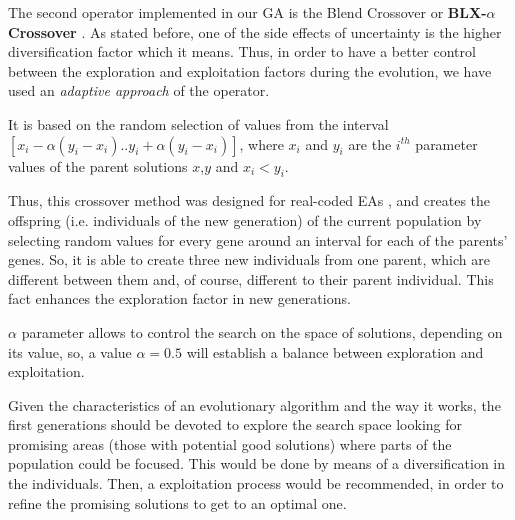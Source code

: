 \documentclass[10pt,journal,compsoc]{IEEEtran}
\begin{document}
The second operator implemented in our GA is the Blend Crossover or  \textbf{BLX-$\alpha$ Crossover} \cite{blx2008}. As stated before, one of the side effects of uncertainty is the higher diversification factor which it means. Thus, in order to have a better control between the exploration and exploitation factors during the evolution, we have used an \textit{adaptive approach} of the operator.

It is based on the random selection of values from the interval
$[x_i-\alpha(y_i-x_i).. y_i+\alpha(y_i-x_i)]$, where $x_i$ and $y_i$
are the $i^{th}$ parameter values of the parent solutions $x$,$y$ and
$x_i < y_i$. %


Thus, this crossover method was designed for real-coded EAs \cite{blx2008}, and creates the offspring (i.e. individuals of the new generation) of the current population by selecting random values for every gene around an interval for each of the parents' genes. So, it is able to create three new individuals from one parent, which are different between them and, of course, different to their parent individual. This fact enhances the exploration factor in new generations.

$\alpha$ parameter allows to control the search on the space of solutions, depending on its value, so, a value $\alpha = 0.5$ will establish a balance between exploration and exploitation.

Given the characteristics of an evolutionary algorithm and the way it works, the first generations should be devoted to explore the search space looking for promising areas (those with potential good solutions) where parts of the population could be focused. This would be done by means of a diversification in the individuals. Then, a exploitation process would be recommended, in order to refine the promising solutions to get to an optimal one.
\end{document}
